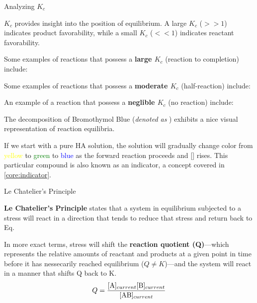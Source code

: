 \documentclass[10pt]{article}
\begin{document}
    \begin{core}{Analyzing $K_c$}
      
      $K_c$ provides insight into the position of equilibrium. A large $K_c$ ($>>1$) indicates product favorability, while a small $K_c$ ($<<1$) indicates reactant favorability.

      Some examples of reactions that possess a \textbf{large $K_c$} (reaction to completion) include:



      Some examples of reactions that possess a \textbf{moderate $K_c$} (half-reaction) include:




      An example of a reaction that possess a \textbf{neglible $K_c$} (no reaction) include:


    \end{core}

    The decomposition of Bromothymol Blue (\textit{denoted as }) exhibits a nice visual representation of reaction equilibria.
   

    If we start with a pure HA solution, the solution will gradually change color from \textcolor{Yellow}{yellow} to \textcolor{Green}{green} to \textcolor{Blue}{blue} as the forward reaction proceeds and [] rises. This particular compound is also known as an indicator, a concept covered in \autoref{core:indicator}.
    
    \begin{core}[label=placeholder3]{Le Chatelier's Principle}

      \textbf{Le Chatelier's Principle} states that a system in equilibrium subjected to a stress will react in a direction that tends to reduce that stress and return back to Eq.

      In more exact terms, stress will shift the \textbf{reaction quotient (Q)}---which represents the relative amounts of reactant and products at a given point in time before it has nessecarily reached equilibrium ($Q \neq K$)---and the system will react in a manner that shifts Q back to K.
      \[
        Q = \frac{[\ce{A}]_{current}[\ce{B}]_{current}}{[\ce{AB}]_{current}}
      \] 

    \end{core}
\end{document}
